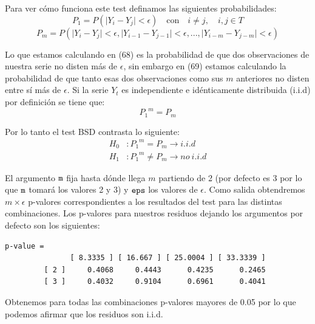 Para ver cómo funciona este test definamos las siguientes probabilidades:
\begin{equation}
    P_1 = P(\lvert Y_i - Y_j \lvert < \epsilon)\quad \text{con} \quad i \neq j, \quad i,j \in T
\end{equation}
\begin{equation}
    P_m = P(\lvert Y_i - Y_j \lvert < \epsilon, \lvert Y_{i-1} - Y_{j-1} \lvert < \epsilon,...,\lvert Y_{i-m} - Y_{j-m} \lvert < \epsilon)
\end{equation}

Lo que estamos calculando en (68) es la probabilidad de que dos observaciones de nuestra serie no disten más de $\epsilon$, sin embargo en (69) estamos calculando la probabilidad de que tanto esas dos observaciones como sus $m$ anteriores no disten entre sí más de $\epsilon$. Si la serie $Y_t$ es independiente e idénticamente distribuida (i.i.d) por definición se tiene que:
\begin{equation}
    {P_1}^m = P_m
\end{equation}

Por lo tanto el test BSD contrasta lo siguiente:
\begin{align}
    H_0 &: {P_1}^m = P_m \rightarrow i.i.d\\
    H_1 &: {P_1}^m \neq P_m \rightarrow no \: i.i.d
\end{align}

El argumento $\verb!m!$ fija hasta dónde llega $m$ partiendo de 2 (por defecto es 3 por lo que $\verb!m!$ tomará los valores 2 y 3) y $\verb!eps!$ los valores de $\epsilon$. Como salida obtendremos $m \times \epsilon$ p-valores correspondientes a los resultados del test para las distintas combinaciones. Los p-valores para nuestros residuos dejando los argumentos por defecto son los siguientes:
\begin{Verbatim}[fontsize=\footnotesize]
         p-value =
               [ 8.3335 ] [ 16.667 ] [ 25.0004 ] [ 33.3339 ]
         [ 2 ]     0.4068     0.4443      0.4235      0.2465
         [ 3 ]     0.4032     0.9104      0.6961      0.4041
\end{Verbatim}

Obtenemos para todas las combinaciones p-valores mayores de 0.05 por lo que podemos afirmar que los residuos son i.i.d.

